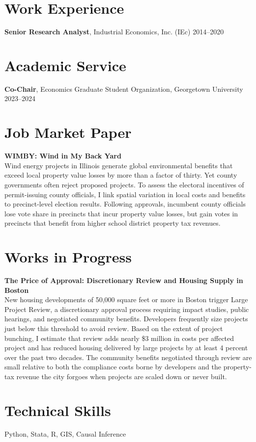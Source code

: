 \documentclass[11pt]{article}
\begin{document}
\section*{Work Experience}

\textbf{Senior Research Analyst}, Industrial Economics, Inc. (IEc) \hfill 2014–2020

\section*{Academic Service}

\textbf{Co-Chair}, Economics Graduate Student Organization, Georgetown University \hfill 2023–2024

\section*{Job Market Paper}

\textbf{WIMBY: Wind in My Back Yard} \\
Wind energy projects in Illinois generate global environmental benefits that exceed local property value losses by more than a factor of thirty. Yet county governments often reject proposed projects. To assess the electoral incentives of permit-issuing county officials, I link spatial variation in local costs and benefits to precinct-level election results. Following approvals, incumbent county officials lose vote share in precincts that incur property value losses, but gain votes in precincts that benefit from higher school district property tax revenues.
\section*{Works in Progress}
\textbf{The Price of Approval: Discretionary Review and Housing Supply in Boston} \\
New housing developments of 50,000 square feet or more in Boston trigger Large Project Review, a discretionary approval process requiring impact studies, public hearings, and negotiated community benefits. Developers frequently size projects just below this threshold to avoid review. Based on the extent of project bunching, I estimate that review adds nearly \$3 million in costs per affected project and has reduced housing delivered by large projects by at least 4 percent over the past two decades. The community benefits negotiated through review are small relative to both the compliance costs borne by developers and the property-tax revenue the city forgoes when projects are scaled down or never built. 



\section*{Technical Skills}
Python, Stata, R, GIS, Causal Inference

\end{document}
